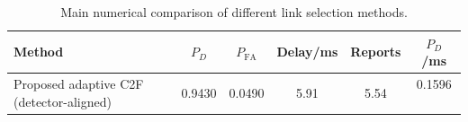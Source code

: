 \begin{table}[t]
    \centering
    \caption{Main numerical comparison of different link selection methods.}
    \label{tab:main_summary}
    \begin{tabular}{l c c c c c}
        \hline
        Method & $P_D$ & $P_{\mathrm{FA}}$ & Delay/ms & Reports & $P_D$/ms \\
        \hline
        Proposed adaptive C2F (detector-aligned) & 0.9430 & 0.0490 & 5.91 & 5.54 & 0.1596 \
        \hline
    \end{tabular}
\end{table}
